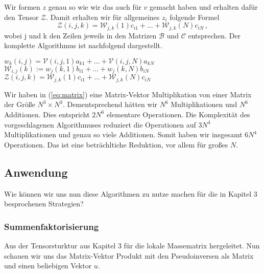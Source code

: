 Wir formen $z$ genau so wie wir das auch für $v$ gemacht haben und erhalten dafür den Tensor $\mathcal{Z}$. Damit erhalten wir für allgemeines $z_{i}$ folgende Formel
\begin{equation}
\mathcal{Z}(i,j,k) = \mathcal{W}_{j,k}(1) c_{i1}  + \dots +  \mathcal{W}_{j,k}(N) c_{iN} \, ,
\end{equation}
wobei j und k den Zeilen jeweils in den Matrizen $\mathcal{B}$ und $\mathcal{C}$ entsprechen. 
\newpage
Der komplette Algorithmus ist nachfolgend dargestellt.
\begin{mdframed}[backgroundcolor=blue!3] 
\begin{algorithmic}
			\State $w_{k}(i,j) = \mathcal{V}(i,j,1)a_{k1} + \dots + \mathcal{V}(i,j,N)a_{kN}$
		\EndFor
	\EndFor
\EndFor
{}
			\State $\mathcal{W}_{i,j} (k):= w_j(k,1) b_{i1} + \dots + w_j(k,N) b_{iN}$
		\EndFor
	\EndFor
\EndFor
{}
			\State $\mathcal{Z}(i,j,k) = \mathcal{W}_{j,k}(1) c_{i1}  + \dots +  \mathcal{W}_{j,k}(N) c_{iN}$ 
		\EndFor
	\EndFor
\EndFor
\end{algorithmic}
\end{mdframed}

 
Wir haben in (\ref{eq:matrix}) eine Matrix-Vektor Multiplikation von einer Matrix der Größe $N^3 \times N^3$. Dementsprechend hätten wir $N^{6}$ Multiplikationen und $N^6$ Additionen. Dies entspricht $2N^6$ elementare Operationen. Die Komplexität des vorgeschlagenen Algorithmuses reduziert die Operationen auf $3N^{4}$ Multiplikationen und genau so viele Additionen. Somit haben wir insgesamt $6N^4$ Operationen. Das ist eine beträchltiche Reduktion, vor allem für großes $N$.
\newline

\newpage
\subsection{Anwendung}

Wie können wir uns nun diese Algorithmen zu nutze machen für die in Kapitel 3 besprochenen Strategien?

\subsubsection{Summenfaktorisierung}

Aus der Tensorsturktur aus Kapitel 3 für die lokale Massematrix hergeleitet. Nun schauen wir uns das Matrix-Vektor Produkt mit den Pseudoinversen als Matrix und einen beliebigen Vektor $u$. 

